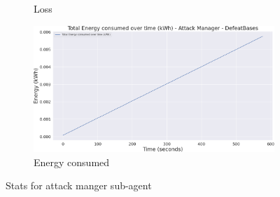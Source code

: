 \begin{figure}[h]
\begin{subfigure}[b]{0.495\textwidth}
        \caption{Loss}
    \end{subfigure}
    \begin{subfigure}[b]{0.495\textwidth}
        \includegraphics[width=1\textwidth]{figs/multi_dqn_army_attack_manager/energy_consumed.png}
        \caption{Energy consumed}
    \end{subfigure}
    \caption{Stats for attack manger sub-agent}
\end{figure}

